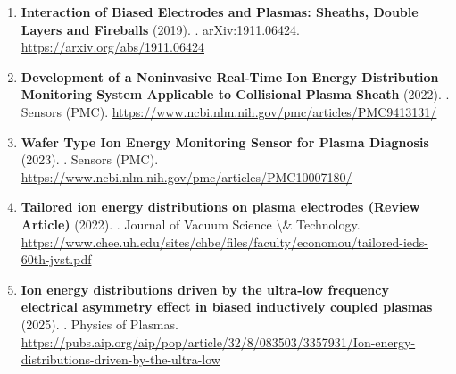 \documentclass[11pt,a4paper]{article}
\begin{document}
\begin{enumerate}[leftmargin=1.4em]
\item \textbf{Interaction of Biased Electrodes and Plasmas: Sheaths, Double Layers and Fireballs} (2019). . arXiv:1911.06424. \url{https://arxiv.org/abs/1911.06424}
\item \textbf{Development of a Noninvasive Real-Time Ion Energy Distribution Monitoring System Applicable to Collisional Plasma Sheath} (2022). . Sensors (PMC). \url{https://www.ncbi.nlm.nih.gov/pmc/articles/PMC9413131/}
\item \textbf{Wafer Type Ion Energy Monitoring Sensor for Plasma Diagnosis} (2023). . Sensors (PMC). \url{https://www.ncbi.nlm.nih.gov/pmc/articles/PMC10007180/}
\item \textbf{Tailored ion energy distributions on plasma electrodes (Review Article)} (2022). . Journal of Vacuum Science \textbackslash{}\& Technology. \url{https://www.chee.uh.edu/sites/chbe/files/faculty/economou/tailored-ieds-60th-jvst.pdf}
\item \textbf{Ion energy distributions driven by the ultra-low frequency electrical asymmetry effect in biased inductively coupled plasmas} (2025). . Physics of Plasmas. \url{https://pubs.aip.org/aip/pop/article/32/8/083503/3357931/Ion-energy-distributions-driven-by-the-ultra-low}
\end{enumerate}
\end{document}
